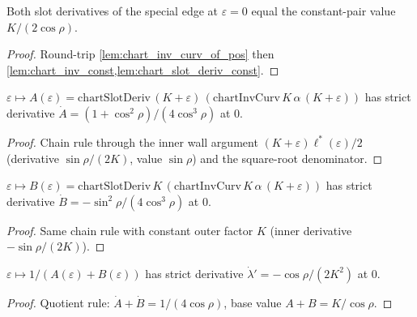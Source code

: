 \begin{lemma}\leanok
[slot derivative at $\varepsilon = 0$]
  \label{lem:two_level_slot_zero}
  Both slot derivatives of the special edge at $\varepsilon = 0$ equal the
  constant-pair value $K/(2\cos\rho)$.
\end{lemma}
\begin{proof}

\leanok
  Round-trip \cref{lem:chart_inv_curv_of_pos} then
  \cref{lem:chart_inv_const,lem:chart_slot_deriv_const}.
\end{proof}

\begin{lemma}
  \label{lem:has_strict_deriv_at_bump_slot_deriv}
  $\varepsilon \mapsto A(\varepsilon) = \mathrm{chartSlotDeriv}\,(K+\varepsilon)\,
  (\mathrm{chartInvCurv}\,K\,\alpha\,(K+\varepsilon))$ has strict derivative
  $\dot A = (1 + \cos^2\rho)/(4\cos^3\rho)$ at $0$.
\end{lemma}
\begin{proof}

\leanok
  Chain rule through the inner wall argument $(K+\varepsilon)\ell^*(\varepsilon)/2$
  (derivative $\sin\rho/(2K)$, value $\sin\rho$) and the square-root
  denominator.
\end{proof}

\begin{lemma}
  \label{lem:has_strict_deriv_at_mixed_slot_deriv}
  $\varepsilon \mapsto B(\varepsilon) = \mathrm{chartSlotDeriv}\,K\,
  (\mathrm{chartInvCurv}\,K\,\alpha\,(K+\varepsilon))$ has strict derivative
  $\dot B = -\sin^2\rho/(4\cos^3\rho)$ at $0$.
\end{lemma}
\begin{proof}

\leanok
  Same chain rule with constant outer factor $K$ (inner derivative
  $-\sin\rho/(2K)$).
\end{proof}

\begin{lemma}
  \label{lem:has_strict_deriv_at_two_level_lambda}
  $\varepsilon \mapsto 1/(A(\varepsilon) + B(\varepsilon))$ has strict
  derivative $\dot\lambda' = -\cos\rho/(2K^2)$ at $0$.
\end{lemma}
\begin{proof}

\leanok
  Quotient rule: $\dot A + \dot B = 1/(4\cos\rho)$, base value
  $A + B = K/\cos\rho$.
\end{proof}

